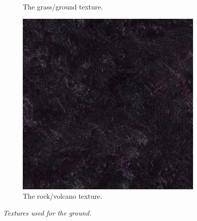 \begin{figure}[H]
\begin{subfigure}{\textwidth/3}
  \caption{The grass/ground texture.}
  \label{fig:textureGrass}
\end{subfigure}
\begin{subfigure}{\textwidth/3}
  \centering
  \includegraphics[width=0.9\linewidth]{images/textureRock.jpg}
  \caption{The rock/volcano texture.}
  \label{fig:textureRock}
\end{subfigure}
\caption[Ground textures]{\textit{Textures used for the ground.}}
\label{fig:textures}
\end{figure}

